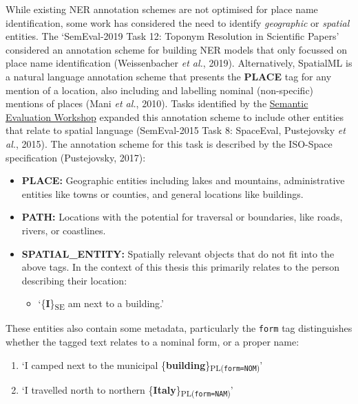 \documentclass[
  letterpaper,
  11pt,
  english,
  onehalfspacing,
  headsepline]{MastersDoctoralThesis}
\providecommand{\tightlist}{%
  \setlength{\itemsep}{0pt}\setlength{\parskip}{0pt}}\usepackage{longtable,booktabs,array}
\begin{document}
While existing NER annotation schemes are not optimised for place name
identification, some work has considered the need to identify
\emph{geographic} or \emph{spatial} entities. The `SemEval-2019 Task 12:
Toponym Resolution in Scientific Papers' considered an annotation scheme
for building NER models that only focussed on place name identification
(Weissenbacher \emph{et al.}, 2019). Alternatively, SpatialML is a
natural language annotation scheme that presents the \textbf{PLACE} tag
for any mention of a location, also including and labelling nominal
(non-specific) mentions of places (Mani \emph{et al.}, 2010). Tasks
identified by the \href{https://semeval.github.io/}{Semantic Evaluation
Workshop} expanded this annotation scheme to include other entities that
relate to spatial language (SemEval-2015 Task 8: SpaceEval, Pustejovsky
\emph{et al.}, 2015). The annotation scheme for this task is described
by the ISO-Space specification (Pustejovsky, 2017):

\begin{itemize}
\tightlist
\item
  \textbf{PLACE:} Geographic entities including lakes and mountains,
  administrative entities like towns or counties, and general locations
  like buildings.
\item
  \textbf{PATH:} Locations with the potential for traversal or
  boundaries, like roads, rivers, or coastlines.
\item
  \textbf{SPATIAL\_ENTITY:} Spatially relevant objects that do not fit
  into the above tags. In the context of this thesis this primarily
  relates to the person describing their location:

  \begin{itemize}
  \tightlist
  \item
    `\{\textbf{I}\}\textsubscript{SE} am next to a building.'
  \end{itemize}
\end{itemize}

These entities also contain some metadata, particularly the
\texttt{form} tag distinguishes whether the tagged text relates to a
nominal form, or a proper name:

\begin{enumerate}
\def\labelenumi{\alph{enumi}.}
\item
  `I camped next to the municipal
  \{\textbf{building}\}\textsubscript{PL(\texttt{form=NOM})}'
\item
  `I travelled north to northern
  \{\textbf{Italy}\}\textsubscript{PL(\texttt{form=NAM})}'
\end{enumerate}
\end{document}
